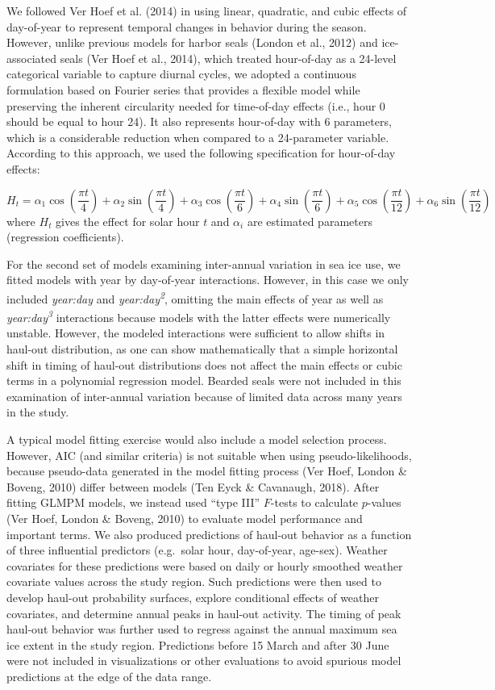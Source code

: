 \documentclass[fleqn,10pt,lineno]{wlpeerj} %
\begin{document}
We followed Ver Hoef et al. (2014) in using linear, quadratic, and cubic
effects of day-of-year to represent temporal changes
in behavior during the season. However, unlike previous models for harbor seals
(London et al., 2012) and ice-associated seals (Ver Hoef et al., 2014), which treated
hour-of-day as a 24-level categorical variable to capture diurnal cycles, we
adopted a continuous formulation based on Fourier series that provides a
flexible model while preserving the inherent circularity needed for time-of-day
effects (i.e., hour 0 should be equal to hour 24). It also represents
hour-of-day with 6 parameters, which is a considerable reduction when compared
to a 24-parameter variable. According to this approach, we used the following
specification for hour-of-day effects:

\[
H_t=\alpha_1 \cos(\frac{\pi t}{4}) + \alpha_2 \sin(\frac{\pi t}{4}) + \alpha_3 \cos(\frac{\pi t}{6}) + \alpha_4 \sin(\frac{\pi t}{6}) + \alpha_5 \cos(\frac{\pi t}{12}) + \alpha_6 \sin(\frac{\pi t}{12})
\]
where \(H_t\) gives the effect for solar hour \(t\) and \(\alpha_{i}\) are
estimated parameters (regression coefficients).

For the second set of models examining inter-annual variation in sea ice use, we
fitted models with year by day-of-year interactions. However, in this case we
only included \emph{year:day} and \emph{year:day\textsuperscript{2}}, omitting the main effects of year as
well as \emph{year:day\textsuperscript{3}} interactions because models with the latter effects were
numerically unstable. However, the modeled interactions were sufficient to allow
shifts in haul-out distribution, as one can show mathematically that a simple
horizontal shift in timing of haul-out distributions does not affect the main
effects or cubic terms in a polynomial regression model. Bearded seals were
not included in this examination of inter-annual variation because of limited
data across many years in the study.

A typical model fitting exercise would also include a model selection process.
However, AIC (and similar criteria) is not suitable when using
pseudo-likelihoods, because pseudo-data generated in the model fitting process
(Ver Hoef, London \& Boveng, 2010) differ between models (Ten Eyck \& Cavanaugh, 2018). After fitting GLMPM
models, we instead used ``type III'' \(F\)-tests to calculate \(p\)-values
(Ver Hoef, London \& Boveng, 2010) to evaluate model performance and important terms. We also
produced predictions of haul-out behavior as a function of three influential
predictors (e.g.~solar hour, day-of-year, age-sex). Weather covariates for these
predictions were based on daily or hourly smoothed weather covariate values
across the study region. Such predictions were then used to develop haul-out
probability surfaces, explore conditional effects of weather covariates, and
determine annual peaks in haul-out activity. The timing of peak haul-out
behavior was further used to regress against the annual maximum sea ice extent
in the study region. Predictions before 15 March and after 30 June were not
included in visualizations or other evaluations to avoid spurious model
predictions at the edge of the data range.
\end{document}
